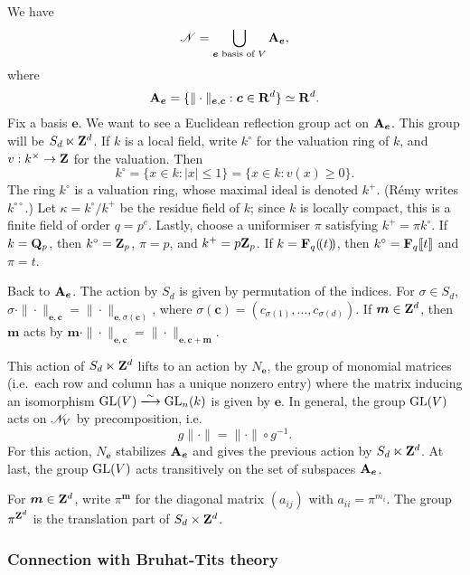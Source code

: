 We have 
\[
  \mathscr{N}=\bigcup_{\boldsymbol e\text{ basis of }V} \mathbf{A}_{\boldsymbol e} ,
\]
where 
\[
  \mathbf{A}_{\boldsymbol e} = \{\|\cdot\|_{\boldsymbol e,\boldsymbol c}:\boldsymbol c\in \mathbf{R}^d\} \simeq \mathbf{R}^d .
\]
Fix a basis $\boldsymbol e$. We want to see a Euclidean reflection group act on 
$\mathbf{A}_{\boldsymbol e}$. This group will be 
$S_d \ltimes \mathbf{Z}^d$. If $k$ is a local field, write 
$k^\circ$ for the valuation ring of $k$, and $v:k^\times \to \mathbf{Z}$ for the 
valuation. Then 
\[
  k^\circ = \{x\in k:|x|\leqslant 1\} = \{x\in k:v(x)\geqslant 0\} .
\]
The ring $k^\circ$ is a valuation ring, whose maximal ideal is denoted 
$k^+$. (R\'emy writes $k^{\circ\circ}$.) Let $\kappa=k^\circ/k^+$ be the residue 
field of $k$; since $k$ is locally compact, this is a finite field of order 
$q=p^e$. Lastly, choose a uniformiser $\pi$ satisfying $k^+=\pi k^\circ$. If 
$k=\mathbf{Q}_p$, then $k^\circ=\mathbf{Z}_p$, $\pi=p$, and $k^+=p \mathbf{Z}_p$. If 
$k=\mathbf{F}_q(\! ( t )\! )$, then $k^\circ=\mathbf{F}_q\llbracket t\rrbracket$ and 
$\pi=t$. 

Back to $\mathbf{A}_{\boldsymbol e}$. The action by $S_d$ is given by permutation of 
the indices. For $\sigma\in S_d$, 
$\sigma\cdot \|\cdot\|_{\boldsymbol e,\boldsymbol c} = \|\cdot\|_{\boldsymbol e, \sigma(\boldsymbol c)}$, 
where $\sigma(\boldsymbol c) = (c_{\sigma(1)},\dots,c_{\sigma(d)})$. 
If $\boldsymbol m\in \mathbf{Z}^d$, then $\boldsymbol m$ acts by 
$\boldsymbol m \cdot \|\cdot\|_{\boldsymbol e,\boldsymbol c} = \|\cdot\|_{\boldsymbol e,\boldsymbol c+\boldsymbol m}$.

This action of $S_d\ltimes \mathbf{Z}^d$ lifts to an action by 
$N_{\boldsymbol e}$, the group of monomial matrices (i.e.\ each row and 
column has a unique nonzero entry) where the matrix inducing an isomorphism 
$\generallinear(V)\isomorphism \generallinear_n(k)$ is given by 
$\boldsymbol e$. In general, the group $\operatorname{GL}(V)$ acts on 
$\mathscr{N}_V$ by precomposition, i.e. 
\[
  g \|\cdot\| = \|\cdot \|\circ g^{-1} .
\]
For this action, $N_{\boldsymbol e}$ stabilizes $\mathbf{A}_{\boldsymbol e}$ and 
gives the previous action by $S_d\ltimes \mathbf{Z}^d$. 
At last, the group $\operatorname{GL}(V)$ acts transitively on the set of 
subspaces $\mathbf{A}_{\boldsymbol e}$. 

For $\boldsymbol m\in \mathbf{Z}^d$, write $\pi^{\boldsymbol m}$ for the diagonal matrix 
$(a_{i j})$ with $a_{i i} = \pi^{m_i}$. The group 
$\pi^{\mathbf{Z}^d}$ is the translation part of $S_d\times \mathbf{Z}^d$. 


\subsubsection{Connection with Bruhat-Tits theory}

